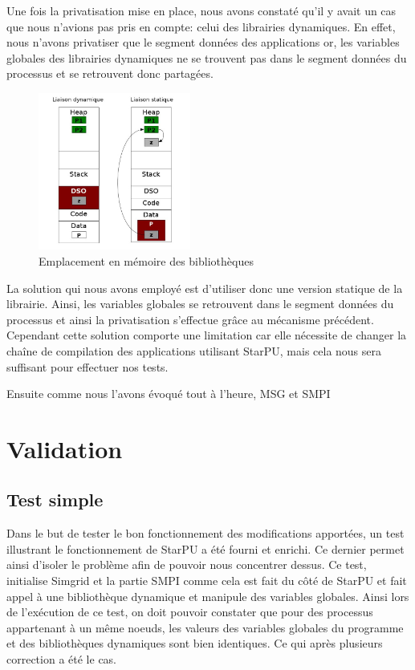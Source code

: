 \documentclass[smallextended]{svjour3}
\begin{document}
Une fois la privatisation mise en place, nous avons constaté qu'il y
avait un cas que nous n'avions pas pris en compte: celui des
librairies dynamiques. En effet, nous n'avons privatiser que le
segment données des applications or, les variables
globales des librairies dynamiques ne se trouvent pas dans le segment
données du processus et se retrouvent donc partagées.

\begin{figure}[htb]
\centering
\includegraphics[width=5cm]{./Img/StaticDyn.jpg}
\caption{\label{fig:2}Emplacement en mémoire des bibliothèques}
\end{figure}

La solution qui nous avons employé est d'utiliser donc une version
statique de la librairie. Ainsi, les variables globales se
retrouvent dans le segment données du processus et ainsi la
privatisation s'effectue grâce au mécanisme précédent. Cependant
cette solution comporte une limitation car elle nécessite de changer la
chaîne de compilation des applications utilisant StarPU, mais cela
nous sera suffisant pour effectuer nos tests. 

Ensuite comme nous l'avons évoqué tout à l'heure, MSG et SMPI 

\section{Validation}
\label{sec-6}
\subsection{Test simple}
\label{sec-6-1}
Dans le but de tester le bon fonctionnement des modifications
apportées, un test illustrant le fonctionnement de StarPU a été
fourni et enrichi. Ce dernier permet ainsi d'isoler le problème
afin de pouvoir nous concentrer dessus. Ce test, initialise Simgrid
et la partie SMPI comme cela est fait du côté de StarPU et fait
appel à une bibliothèque dynamique et manipule des variables
globales. Ainsi lors de l'exécution de ce test, on doit pouvoir
constater que pour des processus appartenant à un même noeuds, les
valeurs des variables globales du programme et des bibliothèques
dynamiques sont bien identiques. Ce qui après plusieurs correction
a été le cas.  
\end{document}
